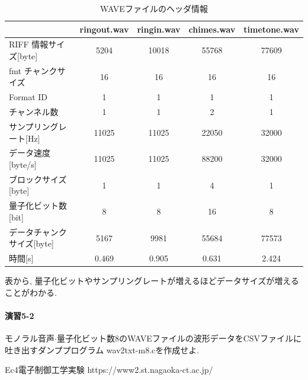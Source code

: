 \documentclass[titlepage]{jsarticle}
\begin{document}
        \begin{table}[ht]
            \centering
            \caption{WAVEファイルのヘッダ情報}
            \label{tab:header}
            \begin{tabular}{l||c|c|c|c} \hline
                                       & ringout.wav   & ringin.wav & chimes.wav & timetone.wav \\ \hline
                RIFF 情報サイズ[byte]    & 5204  & 10018 & 55768 & 77609 \\
                fmt チャンクサイズ       & 16    & 16 & 16 & 16 \\
                Format ID              & 1     & 1   & 1 & 1 \\
                チャンネル数             & 1     & 1 & 2 & 1 \\
                サンプリングレート[Hz]    & 11025 & 11025 & 22050 & 32000 \\
                データ速度[byte/s]       & 11025 & 11025 & 88200 & 32000 \\
                ブロックサイズ[byte]      & 1     & 1 & 4 & 1 \\
                量子化ビット数[bit]       & 8     & 8 & 16 & 8 \\
                データチャンクサイズ[byte] & 5167  & 9981 & 55684 & 77573 \\
                時間[s] & 0.469 & 0.905 & 0.631 & 2.424 \\ \hline
            \end{tabular}
        \end{table}

        表から, 量子化ビットやサンプリングレートが増えるほどデータサイズが増えることがわかる. 

    \paragraph{演習5-2} モノラル音声$\cdot$量子化ビット数8のWAVEファイルの波形データをCSVファイルに吐き出すダンププログラム
    wav2txt-m8.cを作成せよ.

\begin{thebibliography}{99}
     Ec4電子制御工学実験 https://www2.st.nagaoka-ct.ac.jp/
\end{thebibliography}
\end{document}
